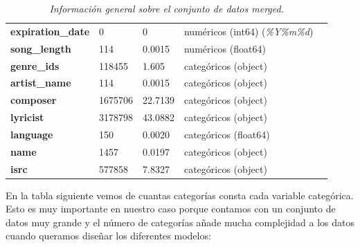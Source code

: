 \documentclass[a4paper]{article}
\begin{document}
\begin{table}[H]
\begin{tabular}{l*{4}l}
\textbf{expiration\_date}         & 0                 & 0           & numéricos (int64) (\textit{\%Y\%m\%d})  \\
\textbf{song\_length}             & 114               & 0.0015      & numéricos (float64)                     \\
\textbf{genre\_ids}               & 118455            & 1.605       & categóricos (object)                    \\
\textbf{artist\_name}             & 114               & 0.0015      & categóricos (object)                    \\
\textbf{composer}                 & 1675706           & 22.7139     & categóricos (object)                    \\
\textbf{lyricist}                 & 3178798           & 43.0882     & categóricos (object)                    \\
\textbf{language}                 & 150               & 0.0020      & categóricos (float64)                   \\
\textbf{name}                     & 1457              & 0.0197      & categóricos (object)                    \\
\textbf{isrc}                     & 577858            & 7.8327      & categóricos (object)                    \\
\end{tabular}
\caption{\textit{Información general sobre el conjunto de datos merged.}}
\end{table}
En la tabla siguiente vemos de cuantas categorías consta cada variable categórica. Esto es muy importante en nuestro caso porque contamos con un conjunto de datos muy grande y el número de categorías añade mucha complejidad a los datos cuando queramos diseñar los diferentes modelos:
\end{document}

